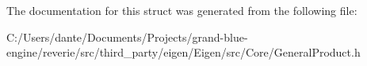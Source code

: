 The documentation for this struct was generated from the following file\+:\begin{DoxyCompactItemize}
\item 
C\+:/\+Users/dante/\+Documents/\+Projects/grand-\/blue-\/engine/reverie/src/third\+\_\+party/eigen/\+Eigen/src/\+Core/General\+Product.\+h\end{DoxyCompactItemize}
